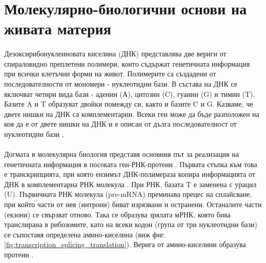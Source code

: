 \documentclass[pdftex,cyrillic,14pt,a4page,twoside,openright]{extreport}
\begin{document}
\section[Молекулярно-биологични основи на живата материя]{Молекулярно-биологични основи на\\ живата материя}\label{sec:basic_genetics}
\paragraph{}

\paragraph{}
Дезоксирибонуклеиновата киселина (ДНК) представлява две вериги от спираловидно преплетени полимери, които съдържат генетичната информация при всички клетъчни форми на живот. Полимерите са създадени от последователности от мономери - нуклеотидни бази. В състава на ДНК се включват четири вида бази - аденин (А), цитозин (C), гуанин (G) и тимин (T). Базите A и T образуват двойки помежду си, както и базите C и G. Казваме, че двете нишки на ДНК са комплементарни. Всеки ген може да бъде разположен на коя да е от двете нишки на ДНК и е описан от дълга последователност от нуклеотидни бази \cite[стр. 301-310]{klug2014}.

\paragraph{}
Догмата в молекулярна биология представя основния път за реализация на генетичната информация в посоката ген-РНК-протеин \cite{crick1970central}. Първата стъпка към това е транскрипцията, при която ензимът ДНК-полимераза копира информацията от ДНК в комплементарна РНК молекула \cite{sims2004}. При РНК, базата T е заменена с урацил (U). Първичната РНК молекула (pre-mRNA) преминава прецес на сплайсване, при който части от нея (интрони) биват изрязвани и остранени. Останалите части (екзони) се свързват отново. Така се образува зрялата мРНК, която бива транслирана в рибозомите, като на всеки кодон (група от три нуклеотидни бази) се съпоставя определена амино-киселина (виж фиг. \ref{fig:transcription_splicing_translation}). Верига от амино-киселини образува протеин \cite[стр. 412-420]{klug2014}.
\end{document}
